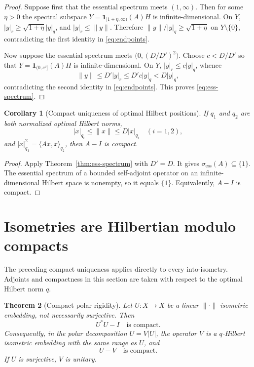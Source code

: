 \documentclass[11pt]{article}
\newtheorem{theorem}{Theorem}[section]
\newtheorem{corollary}[theorem]{Corollary}
\theoremstyle{definition}
\begin{document}
\begin{proof}
Suppose first that the essential spectrum meets $(1,\infty)$.  Then for some
$\eta>0$ the spectral subspace
$Y=\mathbf 1_{[1+\eta,\infty)}(A)H$ is infinite-dimensional.  On $Y$,
$|y|_r\geq\sqrt{1+\eta}|y|_q$, and $|y|_r\leq\|y\|$.  Therefore
$\|y\|/|y|_q\geq\sqrt{1+\eta}$ on $Y\setminus\{0\}$, contradicting the first
identity in \eqref{eq:endpoints}.

Now suppose the essential spectrum meets
$\bigl(0,(D/D')^2\bigr)$.  Choose $c<D/D'$ so that
$Y=\mathbf 1_{(0,c^2]}(A)H$ is infinite-dimensional.  On $Y$,
$|y|_r\leq c|y|_q$, whence
\[
 \|y\|\leq D'|y|_r\leq D'c|y|_q<D|y|_q,
\]
contradicting the second identity in \eqref{eq:endpoints}.  This proves
\eqref{eq:ess-spectrum}.
\end{proof}

\begin{corollary}[Compact uniqueness of optimal Hilbert positions]
\label{cor:compact-unique}
If $q_1$ and $q_2$ are both normalized optimal Hilbert norms,
\[
 |x|_{q_i}\leq\|x\|\leq D|x|_{q_i}\quad(i=1,2),
\]
and $|x|_{q_1}^2=\langle Ax,x\rangle_{q_2}$, then $A-I$ is compact.
\end{corollary}

\begin{proof}
Apply Theorem~\ref{thm:ess-spectrum} with $D'=D$.  It gives
$\sigma_{\mathrm{ess}}(A)\subseteq\{1\}$.  The essential spectrum of a
bounded self-adjoint operator on an infinite-dimensional Hilbert space is
nonempty, so it equals $\{1\}$.  Equivalently, $A-I$ is compact.
\end{proof}

\section{Isometries are Hilbertian modulo compacts}\label{sec:isometries}

The preceding compact uniqueness applies directly to every into-isometry.
Adjoints and compactness in this section are taken with respect to the optimal
Hilbert norm $q$.

\begin{theorem}[Compact polar rigidity]\label{thm:isom-compact}
Let $U:X\to X$ be a linear $\|\cdot\|$-isometric embedding, not necessarily
surjective.  Then
\begin{equation}\label{eq:ustaru}
 U^*U-I\quad\text{is compact}.
\end{equation}
Consequently, in the polar decomposition $U=V|U|$, the operator $V$ is a
$q$-Hilbert isometric embedding with the same range as $U$, and
\[
 U-V\quad\text{is compact}.
\]
If $U$ is surjective, $V$ is unitary.
\end{theorem}
\end{document}
